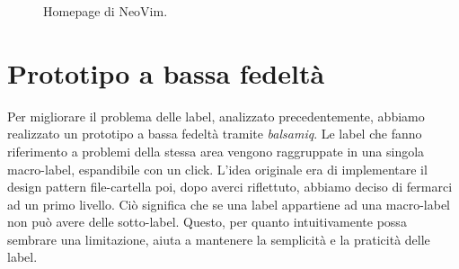 \documentclass[12pt]{article} %
\begin{document}
\begin{figure}[H] 
\caption{Homepage di NeoVim.}
\label{fig:cattivoesempio3}
\end{figure}

\section{Prototipo a bassa fedeltà}
Per migliorare il problema delle label, analizzato precedentemente, abbiamo realizzato un prototipo a bassa fedeltà tramite \emph{balsamiq}.
Le label che fanno riferimento a problemi della stessa area vengono raggruppate in una singola macro-label, espandibile con un click. L'idea originale era di implementare il design pattern file-cartella poi, dopo averci riflettuto, abbiamo deciso di fermarci ad un primo livello. Ciò significa che se una label appartiene ad una macro-label non può avere delle sotto-label.
Questo, per quanto intuitivamente possa sembrare una limitazione, aiuta a mantenere la semplicità e la praticità delle label.

\end{document}
